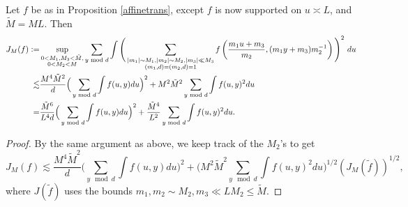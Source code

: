 \begin{corollary}\label{cor: affine}
    Let $f$ be as in Proposition \ref{affinetrans}, except $f$ is now supported on $u \asymp L$, and $\tilde{M}={ML}$. Then \begin{align*}
        J_{M}(f)\mathrel{\mathop:}= &\sup_{\substack{0<M_1,M_3<\tilde{M}, \\ 0< M_2<{M}}}\sum_{y \textrm{ mod } d} \int\Bigg( \sum_{\substack{|m_1|\sim M_1,|m_2|\sim M_2 , |m_3|\ll M_3\\ (m_1,d)=(m_2,d)=1}} f\left(\frac{m_1 u+m_3}{m_2},(m_1 y+m_3)m_2^{-1}\right)\Bigg)^2 \ du\\
        \lesssim&\frac{M^4\tilde{M}^2}{d}\Big(\sum_{y \textrm{ mod } d } \int f(u,y) du\Big)^2  + {M}^2\tilde{M}^2\sum_{y\textrm{ mod } d} \int f(u,y)^2 du\\
        =&\frac{\tilde{M}^6}{L^4d}\Big(\sum_{y \textrm{ mod } d } \int f(u,y) du\Big)^2  + \frac{\tilde{M}^4}{L^2}\sum_{y\textrm{ mod } d} \int f(u,y)^2 du
        .
    \end{align*}
\end{corollary}
\begin{proof}
    By the same argument as above, we keep track of the $M_2$'s to get 
    \[
        J_{{M}}(f) \lesssim \frac{M^4\tilde{M}^2}{d} \Big(\sum_{y \mod d } \int f(u,y) du\Big)^2 + \Big(M^2\tilde{M}^2\sum_{y\mod d} \int f(u,y)^2 du\Big)^{1/2}(J_{M}(\tilde{f}))^{1/2},
    \] where $J(\tilde{f})$ uses the bounds $m_1,m_2\sim M_2, m_3 \ll LM_2\leq \tilde{M}$.
\end{proof}
